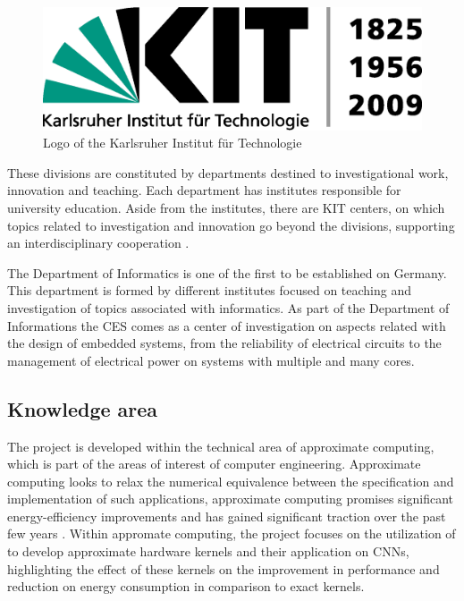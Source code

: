\begin{figure}
    \includegraphics[width=\linewidth]{fig/kitlogo.eps}
    \caption{Logo of the Karlsruher Institut für Technologie \cite{kitlogo}}
    \label{fig:kitlogo}
\end{figure}

These divisions are constituted by departments destined to investigational work, innovation and teaching.
Each department has institutes responsible for university education. Aside from the institutes, there are
KIT centers, on which topics related to investigation and innovation go beyond the divisions, supporting
an interdisciplinary cooperation \cite{kitorg}. 


The Department of Informatics is one of the first to be established on Germany. This department is formed
by different institutes focused on teaching and investigation of topics associated with informatics. As
part of the Department of Informations the CES comes as a center of investigation on aspects related
with the design of embedded systems, from the reliability of electrical circuits to the management of
electrical power on systems with multiple and many cores.

\subsection{Knowledge area}

The project is developed within the technical area of approximate computing, which is part of the areas
of interest of computer engineering. Approximate computing looks to relax the numerical equivalence 
between the specification and implementation of such applications, approximate computing promises significant 
energy-efficiency improvements and has gained significant traction over the past few years \cite{surveyqu}. Within
appromate computing, the project focuses on the utilization of \intelOCL to develop approximate hardware
kernels and their application on CNNs, highlighting the effect of these kernels on the improvement in 
performance and reduction on energy consumption in comparison to exact kernels.

